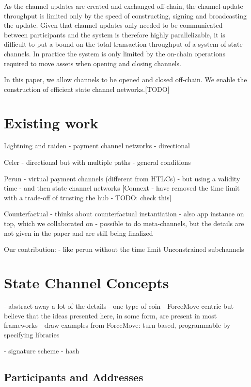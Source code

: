 \documentclass{article}
\theoremstyle{definition}
\begin{document}
As the channel updates are created and exchanged off-chain, the channel-update throughput is limited only by the speed of constructing, signing and broadcasting the update.
Given that channel updates only needed to be communicated between participants and the system is therefore highly parallelizable, it is difficult to put a bound on the total transaction throughput of a system of state channels.
In practice the system is only limited by the on-chain operations required to move assets when opening and closing channels.

In this paper, we allow channels to be opened and closed off-chain. We enable the construction of efficient state channel networks.[TODO]

\section{Existing work}

Lightning and raiden
- payment channel networks
- directional

Celer
- directional but with multiple paths
- general conditions

Perun
- virtual payment channels (different from HTLCs)
- but using a validity time
- and then state channel networks
[Connext - have removed the time limit with a trade-off of trusting the hub - TODO: check this]

Counterfactual
- thinks about counterfactual instantiation
- also app instance on top, which we collaborated on
- possible to do meta-channels, but the details are not given in the paper and are still being finalized

Our contribution:
- like perun without the time limit
Unconstrained subchannels

\section{State Channel Concepts}



- abstract away a lot of the details
- one type of coin
- ForceMove centric but believe that the ideas presented here, in some form, are present in most frameworks
- draw examples from ForceMove: turn based, programmable by specifying libraries

- signature scheme
- hash

\subsection{Participants and Addresses}
\end{document}
